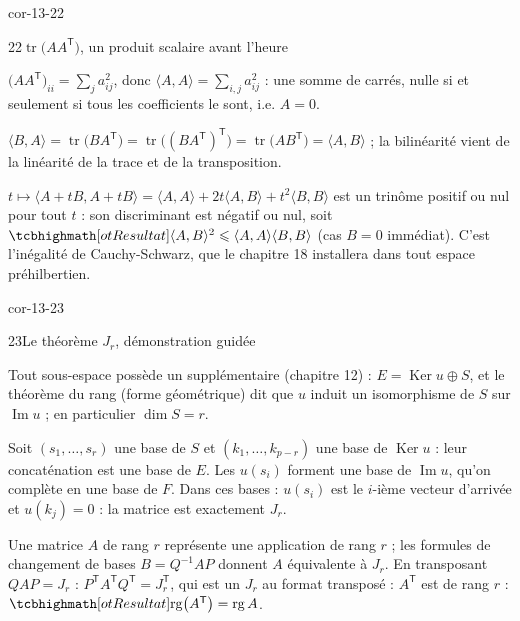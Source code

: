 \begin{blocLivre}{cor-13-22}
\begin{corrige}{22}{$\operatorname{tr}\bigl(AA^{\mathsf T}\bigr)$, un produit scalaire avant l'heure}
\begin{questions}
  \item $\bigl(AA^{\mathsf T}\bigr)_{ii}=\sum_{j}a_{ij}^{2}$, donc
    $\langle A,A\rangle=\sum_{i,j}a_{ij}^{2}$ : une somme de carrés, nulle
    si et seulement si tous les coefficients le sont, i.e. $A=0$.
  \item $\langle B,A\rangle=\operatorname{tr}\bigl(BA^{\mathsf T}\bigr)
    =\operatorname{tr}\bigl((BA^{\mathsf T})^{\mathsf T}\bigr)
    =\operatorname{tr}\bigl(AB^{\mathsf T}\bigr)=\langle A,B\rangle$ ; la
    bilinéarité vient de la linéarité de la trace et de la transposition.
  \item $t\mapsto\langle A+tB,A+tB\rangle
    =\langle A,A\rangle+2t\langle A,B\rangle+t^{2}\langle B,B\rangle$ est
    un trinôme positif ou nul pour tout $t$ : son discriminant est négatif
    ou nul, soit
    $\res{\langle A,B\rangle^{2}\leqslant\langle A,A\rangle\langle B,B\rangle}$
    (cas $B=0$ immédiat). C'est l'inégalité de Cauchy-Schwarz, que le
    chapitre 18 installera dans tout espace préhilbertien.
\end{questions}
\end{corrige}
\end{blocLivre}

\begin{blocLivre}{cor-13-23}
\begin{corrige}{23}{Le théorème $J_r$, démonstration guidée}
\begin{questions}
  \item Tout sous-espace possède un supplémentaire (chapitre 12) :
    $E=\operatorname{Ker}u\oplus S$, et le théorème du rang (forme
    géométrique) dit que $u$ induit un isomorphisme de $S$ sur
    $\operatorname{Im}u$ ; en particulier $\dim S=r$.
  \item Soit $(s_1,\dots,s_r)$ une base de $S$ et $(k_1,\dots,k_{p-r})$
    une base de $\operatorname{Ker}u$ : leur concaténation est une base de
    $E$. Les $u(s_i)$ forment une base de $\operatorname{Im}u$, qu'on
    complète en une base de $F$. Dans ces bases : $u(s_i)$ est le
    $i$-ième vecteur d'arrivée et $u(k_j)=0$ : la matrice est exactement
    $J_r$.
  \item Une matrice $A$ de rang $r$ représente une application de rang
    $r$ ; les formules de changement de bases
    $B=Q^{-1}AP$ donnent $A$ équivalente à $J_r$. En transposant
    $QAP=J_r$ : $P^{\mathsf T}A^{\mathsf T}Q^{\mathsf T}=J_r^{\mathsf T}$,
    qui est un $J_r$ au format transposé : $A^{\mathsf T}$ est de rang
    $r$ :
    $\res{\operatorname{rg}\bigl(A^{\mathsf T}\bigr)=\operatorname{rg}A}$.
\end{questions}
\end{corrige}
\end{blocLivre}

